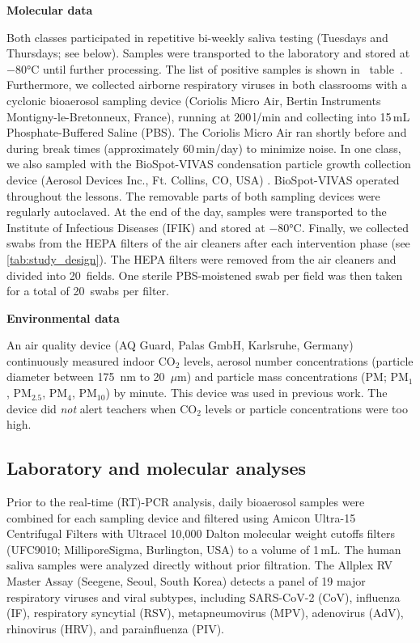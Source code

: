 \documentclass[fleqn,11pt]{wlscirep}
\begin{document}
\noindent\textbf{Molecular data} \smallskip

\noindent Both classes participated in repetitive bi-weekly saliva testing (Tuesdays and Thursdays; see  below). Samples were transported to the laboratory and stored at $-$80°C until further processing\cite{Galar2021,To2019,Huber2021}. The list of positive samples is shown in \supp~table~. Furthermore, we collected airborne respiratory viruses in both classrooms with a cyclonic bioaerosol sampling device (Coriolis Micro Air, Bertin Instruments Montigny-le-Bretonneux, France), running at 200\,l/min and collecting into 15\,mL Phosphate-Buffered Saline (PBS). The Coriolis Micro Air ran shortly before and during break times (approximately 60\,min/day) to minimize noise. In one class, we also sampled with the BioSpot-VIVAS condensation particle growth collection device (Aerosol Devices Inc., Ft. Collins, CO, USA) \cite{Pan2016JAM,Lednicky2016AST}. BioSpot-VIVAS operated throughout the lessons. The removable parts of both sampling devices were regularly autoclaved. At the end of the day, samples were transported to the Institute of Infectious Diseases (IFIK) and stored at $-$80°C. Finally, we collected swabs from the HEPA filters of the air cleaners after each intervention phase (see \cref{tab:study_design}). The HEPA filters were removed from the air cleaners and divided into 20~fields. One sterile PBS-moistened swab per field was then taken for a total of 20~swabs per filter. \medskip

\noindent\textbf{Environmental data} \smallskip

\noindent An air quality device (AQ Guard, Palas GmbH, Karlsruhe, Germany) continuously measured indoor CO$_2$ levels, aerosol number concentrations (particle diameter between 175~nm to 20~$\mu$m) and particle mass concentrations (PM; PM$_1$, PM$_{2.5}$, PM$_4$, PM$_{10}$) by minute. This device was used in previous work\cite{DiGilio2021,Duill2021,Banholzer2023PLoSMed}. The device did \emph{not} alert teachers when CO$_2$ levels or particle concentrations were too high.

\subsection*{Laboratory and molecular analyses}\label{sec:mol_analyses}

\noindent Prior to the real-time (RT)-PCR analysis, daily bioaerosol samples were combined for each sampling device and filtered using Amicon Ultra-15 Centrifugal Filters with Ultracel 10,000 Dalton molecular weight cutoffs filters (UFC9010; MilliporeSigma, Burlington, USA) to a volume of 1\,mL. The human saliva samples were analyzed directly without prior filtration. The Allplex RV Master Assay (Seegene, Seoul, South Korea) detects a panel of 19 major respiratory viruses and viral subtypes, including SARS-CoV-2 (CoV), influenza (IF), respiratory syncytial (RSV), metapneumovirus (MPV), adenovirus (AdV), rhinovirus (HRV), and parainfluenza (PIV). 
\end{document}
